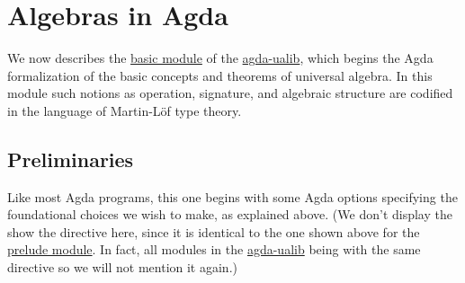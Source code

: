 \documentclass[sigplan,screen]{acmart}
\newcommand\preludemodule{\href{https://gitlab.com/ualib/ualib.gitlab.io/-/blob/master/prelude.lagda.rst}{prelude module}\xspace}
\newcommand\basicmodule{\href{https://gitlab.com/ualib/ualib.gitlab.io/-/blob/master/basic.lagda.rst}{basic module}\xspace}
\newcommand{\agdaualib}{\href{https://ualib.org}{agda-ualib}\xspace}
\newcommand{\agdaualib}{\href{anonymizedLink/agda-ualib.html}{agda-ualib}\xspace}
\newcommand\preludemodule{\href{anonymizedLink/prelude.lagda.rst}{prelude module}\xspace}
\newcommand\basicmodule{\href{anonymizedLink/basic.lagda.rst}{basic module}\xspace}
\begin{document}
\section{Algebras in Agda}
We now describes the \basicmodule of the \agdaualib, which begins the Agda formalization of the basic concepts and theorems of universal algebra. In this module such notions as operation, signature, and algebraic structure are codified in the language of Martin-L\"of type theory.

\subsection{Preliminaries}
Like most Agda programs, this one begins with some Agda options specifying the foundational choices we wish to make, as explained above.  (We don't display the show the  directive here, since it is identical to the one shown above for the \preludemodule.  In fact, all modules in the \agdaualib being with the same  directive so we will not mention it again.)
\end{document}
